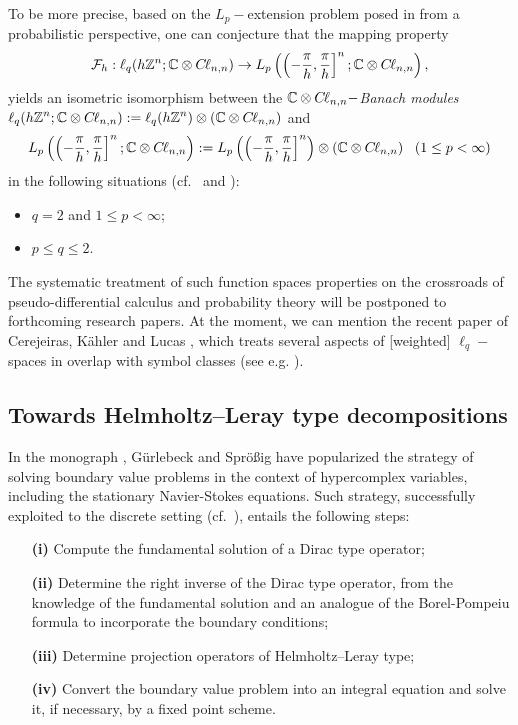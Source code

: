 \documentclass{elsarticle}
\newcommand{\BC}{{\mathbb C}}
\newcommand{\BZ}{{\mathbb Z}}
\newcommand{\Qh}{\left(-\frac{\pi}{h},\frac{\pi}{h}\right]^n}
\newcommand{\cl}{C \kern -0.1em \ell}
\begin{document}
To be more precise, based on the $L_p-$extension problem posed in \cite[Subsection 2.1.]{hytonen2016analysis} from a probabilistic perspective, one can conjecture that the mapping property $$\mathcal{F}_{h}:\ell_q(h\BZ^n;\BC \otimes \cl_{n,n})\rightarrow L_p\left(\Qh;\BC \otimes \cl_{n,n}\right),$$
yields an isometric isomorphism between the $\BC\otimes\cl_{n,n}-${\it Banach modules} $\displaystyle \ell_q(h\BZ^n;\BC\otimes\cl_{n,n}):=\ell_q(h\BZ^n)\otimes\left(\BC\otimes \cl_{n,n}\right)$ and $$L_p\left(\Qh;\BC\otimes\cl_{n,n}\right):=L_p\left(\Qh\right)\otimes\left(\BC\otimes \cl_{n,n}\right)~~(1\leq p <\infty)$$
in the following situations (cf.~\cite[Subsection 2.1.b]{hytonen2016analysis} and \cite[Example 2.2.8 of p. 94]{hytonen2016analysis}):
\begin{itemize}
	\item $q=2$ and $1\leq p<\infty$;
	\item $p\leq q\leq 2$.
\end{itemize} 

The systematic treatment of such function spaces properties on the crossroads of pseudo-differential calculus and probability theory will be postponed to forthcoming research papers. At the moment, we can mention the recent paper of Cerejeiras, K\"ahler and Lucas \cite{cerejeiras2021discrete}, which treats several aspects of [weighted] $\ell_q-$ spaces in overlap with symbol classes (see e.g. \cite[Theorem 4 \&  Theorem 8]{cerejeiras2021discrete}).

\subsection{Towards Helmholtz–Leray type decompositions}




In the monograph \cite{gurlebeck1997quaternionic}, G\"urlebeck and Spr\"o\ss ig have popularized the strategy of solving boundary value problems in the context of hypercomplex variables, including the stationary Navier-Stokes equations.
Such strategy, successfully exploited to the discrete setting (cf.~\cite{faustino2006difference,CFV08}), entails the following steps:
\begin{itemize}
	\item[\bf (i)] Compute the fundamental solution of a Dirac type operator;
	\item[\bf (ii)] Determine the right inverse of the Dirac type operator, from the knowledge of the fundamental solution and an analogue of the Borel-Pompeiu formula to incorporate the boundary conditions;
	\item[\bf (iii)] Determine projection operators of Helmholtz–Leray type;
	\item[\bf (iv)] Convert the boundary value problem into an integral equation and solve it, if necessary, by a fixed point scheme.
\end{itemize}
\end{document}
